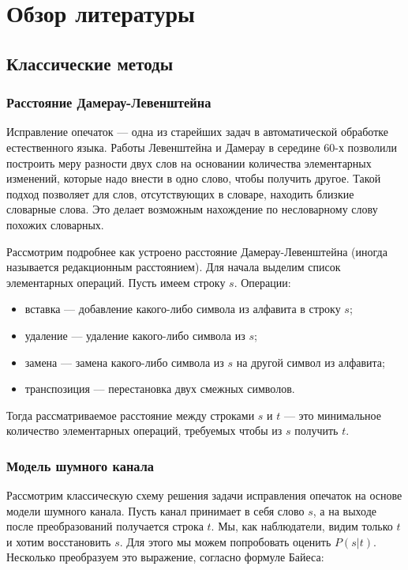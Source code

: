 \chapter{Обзор литературы}

\section{Классические методы}

\subsection{Расстояние Дамерау-Левенштейна}

Исправление опечаток --- одна из старейших задач в автоматической обработке естественного языка. Работы Левенштейна \cite{Levenshtein1965} и Дамерау \cite{Damerau1964} в середине 60-х позволили построить меру разности двух слов на основании количества элементарных изменений, которые надо внести в одно слово, чтобы получить другое. Такой подход позволяет для слов, отсутствующих в словаре, находить близкие словарные слова. Это делает возможным нахождение по несловарному слову похожих словарных.

Рассмотрим подробнее как устроено расстояние Дамерау-Левенштейна (иногда называется редакционным расстоянием). Для начала выделим список элементарных операций. Пусть имеем строку $s$. Операции:
\begin{itemize}
	\item вставка --- добавление какого-либо символа из алфавита в строку $s$;
	\item удаление --- удаление какого-либо символа из $s$;
	\item замена --- замена какого-либо символа из $s$ на другой символ из алфавита;
	\item транспозиция --- перестановка двух смежных символов.
\end{itemize}

Тогда рассматриваемое расстояние между строками $s$ и $t$ --- это минимальное количество элементарных операций, требуемых чтобы из $s$ получить $t$. 

\subsection{Модель шумного канала}

Рассмотрим классическую схему решения задачи исправления опечаток на основе модели шумного канала. Пусть канал принимает в себя слово $s$, а на выходе после преобразований получается строка $t$. Мы, как наблюдатели, видим только $t$ и хотим восстановить $s$. Для этого мы можем попробовать оценить $P(s|t)$. Несколько преобразуем это выражение, согласно формуле Байеса:

